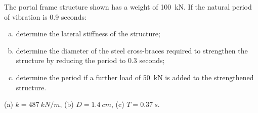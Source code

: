 
\begin{Exercise}[label={frames_modification}]
The portal frame structure shown has a weight of \qty{100}{kN}. If the natural period of vibration is 0.9 seconds:
\begin{enumerate}[(a)]
    \item determine the lateral stiffness of the structure;
    \item determine the diameter of the steel cross-braces required to strengthen the structure by reducing the period to 0.3 seconds;
    \item determine the period if a further load of \qty{50}{kN} is added to the strengthened structure.
\end{enumerate}

\begin{center}
\end{center}

\shortAnswer (a) $k = \SI{487}{kN/m}$, (b) $D = \SI{1.4}{cm}$, (c) $T = \SI{0.37}{s}$.
\end{Exercise}



